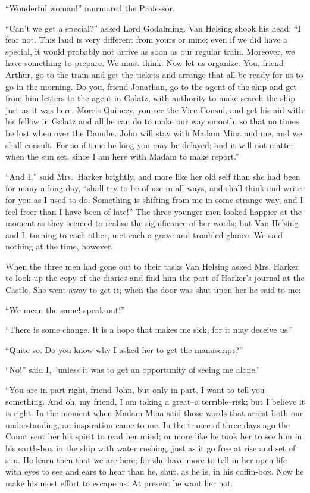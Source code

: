 \documentclass[12pt,openright]{book}
\begin{document}
“Wonderful woman!” murmured the Professor.

“Can’t we get a special?” asked Lord Godalming. Van Helsing shook his head: “I fear not. This land is very different from yours or mine; even if we did have a special, it would probably not arrive as soon as our regular train. Moreover, we have something to prepare. We must think. Now let us organize. You, friend Arthur, go to the train and get the tickets and arrange that all be ready for us to go in the morning. Do you, friend Jonathan, go to the agent of the ship and get from him letters to the agent in Galatz, with authority to make search the ship just as it was here. Morris Quincey, you see the Vice-Consul, and get his aid with his fellow in Galatz and all he can do to make our way smooth, so that no times be lost when over the Danube. John will stay with Madam Mina and me, and we shall consult. For so if time be long you may be delayed; and it will not matter when the sun set, since I am here with Madam to make report.”

“And I,” said Mrs. Harker brightly, and more like her old self than she had been for many a long day, “shall try to be of use in all ways, and shall think and write for you as I used to do. Something is shifting from me in some strange way, and I feel freer than I have been of late!” The three younger men looked happier at the moment as they seemed to realise the significance of her words; but Van Helsing and I, turning to each other, met each a grave and troubled glance. We said nothing at the time, however.

When the three men had gone out to their tasks Van Helsing asked Mrs. Harker to look up the copy of the diaries and find him the part of Harker’s journal at the Castle. She went away to get it; when the door was shut upon her he said to me:–

“We mean the same! speak out!”

“There is some change. It is a hope that makes me sick, for it may deceive us.”

“Quite so. Do you know why I asked her to get the manuscript?”

“No!” said I, “unless it was to get an opportunity of seeing me alone.”

“You are in part right, friend John, but only in part. I want to tell you something. And oh, my friend, I am taking a great–a terrible–risk; but I believe it is right. In the moment when Madam Mina said those words that arrest both our understanding, an inspiration came to me. In the trance of three days ago the Count sent her his spirit to read her mind; or more like he took her to see him in his earth-box in the ship with water rushing, just as it go free at rise and set of sun. He learn then that we are here; for she have more to tell in her open life with eyes to see and ears to hear than he, shut, as he is, in his coffin-box. Now he make his most effort to escape us. At present he want her not.
\end{document}
